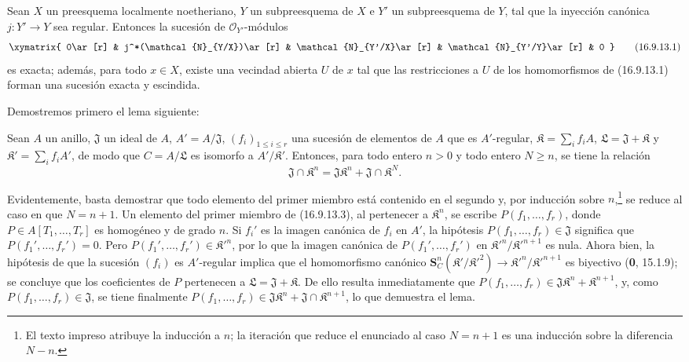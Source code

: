\begin{proposition}[16.9.13]
\label{IV.16.9.13}
Sean $X$ un preesquema localmente noetheriano, $Y$ un subpreesquema de $X$ e
$Y'$ un subpreesquema de $Y$, tal que la inyección canónica $j:Y'\to Y$ sea
regular. Entonces la sucesión de $\mathcal{O}_{Y'}$-módulos
\[
  \xymatrix{
    0\ar[r] & j^*(\mathcal{N}_{Y/X})\ar[r]
      & \mathcal{N}_{Y'/X}\ar[r] & \mathcal{N}_{Y'/Y}\ar[r] & 0
  }
  \tag{16.9.13.1}
  \label{IV.16.9.13.1}
\]
es exacta; además, para todo $x\in X$, existe una vecindad abierta $U$ de $x$
tal que las restricciones a $U$ de los homomorfismos de \textup{(16.9.13.1)} forman
una sucesión exacta y escindida.
\end{proposition}

Demostremos primero el lema siguiente:

\begin{lemma}[16.9.13.2]
\label{IV.16.9.13.2}
Sean $A$ un anillo, $\mathfrak{J}$ un ideal de $A$,
$A'=A/\mathfrak{J}$, $(f_i)_{1\leq i\leq r}$ una sucesión de elementos de
$A$ que es $A'$-regular, $\mathfrak{K}=\sum_i f_iA$,
$\mathfrak{L}=\mathfrak{J}+\mathfrak{K}$ y
$\mathfrak{K}'=\sum_i f_iA'$, de modo que $C=A/\mathfrak{L}$ es isomorfo a
$A'/\mathfrak{K}'$. Entonces, para todo entero $n>0$ y todo entero $N\geq n$,
se tiene la relación
\[
  \mathfrak{J}\cap\mathfrak{K}^n
  =\mathfrak{J}\mathfrak{K}^n+\mathfrak{J}\cap\mathfrak{K}^N.
  \tag{16.9.13.3}
  \label{IV.16.9.13.3}
\]
\end{lemma}

Evidentemente, basta demostrar que todo elemento del primer miembro está
contenido en el segundo y, por inducción sobre $n$,\footnote{El texto
impreso atribuye la inducción a $n$; la iteración que reduce el enunciado al
caso $N=n+1$ es una inducción sobre la diferencia $N-n$.} se reduce al caso en
que $N=n+1$. Un elemento del primer miembro de (16.9.13.3), al pertenecer a
$\mathfrak{K}^n$, se escribe $P(f_1,\ldots,f_r)$, donde
$P\in A[T_1,\ldots,T_r]$ es homogéneo y de grado $n$. Si $f_i'$ es la imagen
canónica de $f_i$ en $A'$, la hipótesis
$P(f_1,\ldots,f_r)\in\mathfrak{J}$ significa que
$P(f_1',\ldots,f_r')=0$. Pero
$P(f_1',\ldots,f_r')\in\mathfrak{K}'^n$, por lo que la imagen canónica de
$P(f_1',\ldots,f_r')$ en
$\mathfrak{K}'^n/\mathfrak{K}'^{n+1}$ es nula. Ahora bien, la hipótesis de que
la sucesión $(f_i)$ es $A'$-regular implica que el homomorfismo canónico
$\mathbf{S}_C^n(\mathfrak{K}'/\mathfrak{K}'^2)\to\mathfrak{K}'^n/\mathfrak{K}'^{n+1}$
es biyectivo (\textbf 0, 15.1.9); se concluye que los coeficientes de $P$ pertenecen
a $\mathfrak{L}=\mathfrak{J}+\mathfrak{K}$. De ello resulta inmediatamente
que $P(f_1,\ldots,f_r)\in\mathfrak{J}\mathfrak{K}^n+\mathfrak{K}^{n+1}$, y,
como $P(f_1,\ldots,f_r)\in\mathfrak{J}$, se tiene finalmente
$P(f_1,\ldots,f_r)\in\mathfrak{J}\mathfrak{K}^n+\mathfrak{J}\cap\mathfrak{K}^{n+1}$,
lo que demuestra el lema.

